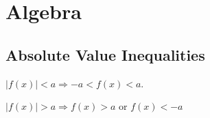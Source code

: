\section{Algebra}
\subsection*{Absolute Value Inequalities}
$ |f(x)| < a  \Rightarrow  -a < f(x) < a$. 

$|f(x)| > a  \Rightarrow f(x) > a$ or $f(x) < -a$